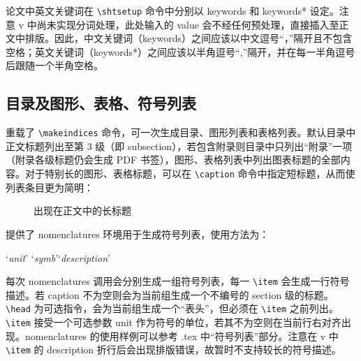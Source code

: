 \documentclass[bachelor, comfort]{shtthesis}
\begin{document}
论文中英文关键词在 \verb|\shtsetup| 命令中分别以 keywords 和 keywords* 设定。注意 \shtthesis{} v\version{} 中尚未实现分词处理，此处输入的 value 会不经任何预处理，直接插入至正文中排版。因此，中文关键词（keywords）之间应该以中文逗号“，”隔开且不包含空格；英文关键词（keywords*）之间应该以半角逗号“,”隔开，并在每一半角逗号后跟随一个半角空格。
\begin{latex}
\end{latex}

\subsection{目录及图形、表格、符号列表}
\shtthesis{} 重载了 \verb|\makeindices| 命令，可一次生成目录、图形列表和表格列表。默认目录中正文标题列出至第 3 级（即 subsection），若包含附录则目录中只列出“附录”一项（附录各级标题仍会生成 PDF 书签），图形、表格列表中列出图表标题的全部内容。对于特别长的图形、表格标题，可以在 \verb|\caption| 命令中指定短标题，从而使列表条目更为简明：
\begin{latex}
\begin{figure}
  \caption[出现在图形列表内的短标题]{出现在正文中的长标题}
\end{figure}
\end{latex}

\shtthesis{} 提供了 nomenclatures 环境用于生成符号列表，使用方法为：
\begin{latex}
\begin{nomenclatures}
  \item[`\emph{unit}']{`\emph{symb}'}{`\emph{description}'}
\end{nomenclatures}
\end{latex}
每次 nomenclatures 调用会分别生成一组符号列表，每一 \verb|\item| 会生成一行符号描述。若 caption 不为空则会为当前组生成一个不编号的 section 级的标题。\verb|\head| 为可选指令，会为当前组生成一个“表头”，但必须在 \verb|\item| 之前列出。\verb|\item| 接受一个可选参数 unit 作为符号的单位，若其不为空则在当前行右对齐出现。nomenclatures 的使用样例可以参考 \jobname.tex 中“符号列表”部分。注意在 \shtthesis{} v\version{} 中 \verb|\item| 的 description 折行后会出现排版错误，故暂时不支持较长的符号描述。
\end{document}
